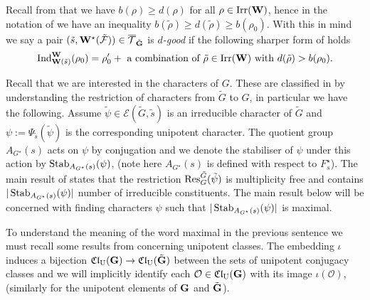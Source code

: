 \documentclass[eqthmnum]{jt-calcs}
\newcommand{\Clu}{\ensuremath{\mathfrak{Cl}_{\mathrm{U}}}}
\renewcommand{\cref}{\Cref}
\begin{document}
\begin{definition}
Recall from \cite[1.1(I)]{spaltenstein:1985:on-the-generalized-springer-correspondence} that we have $b(\rho) \geqslant d(\rho)$ for all $\rho \in \operatorname{Irr}(\mathbf{W})$, hence in the notation of \cref{prop:lusztig-j-ind} we have an inequality $b(\tilde{\rho}) \geqslant d(\tilde{\rho}) \geqslant b(\rho_0)$. With this in mind we say a pair $(\tilde{s},\mathbf{W}^{\star}(\tilde{\mathcal{F}})) \in \overline{\mathcal{T}}_{\tilde{\mathbf{G}}}$ is \emph{$d$-good} if the following sharper form of \cref{prop:lusztig-j-ind} holds
\begin{equation*}
\operatorname{Ind}_{\mathbf{W}(\tilde{s})}^{\mathbf{W}}(\rho_0) = \rho_0' + \text{ a combination of }\tilde{\rho} \in \operatorname{Irr}(\mathbf{W}) \text{ with }d(\tilde{\rho}) > b(\rho_0).
\end{equation*}
\end{definition}

\begin{pa}
Recall that we are interested in the characters of $G$. These are classified in \cite{lusztig:1988:reductive-groups-with-a-disconnected-centre} by understanding the restriction of characters from $\tilde{G}$ to $G$, in particular we have the following. Assume $\tilde{\psi} \in \mathcal{E}(\tilde{G},\tilde{s})$ is an irreducible character of $\tilde{G}$ and $\psi := \Psi_{\tilde{s}}(\tilde{\psi})$ is the corresponding unipotent character. The quotient group $A_{G^{\star}}(s)$ acts on $\psi$ by conjugation and we denote the stabiliser of $\psi$ under this action by $\operatorname{Stab}_{A_{G^{\star}}(s)}(\psi)$, (note here $A_{G^{\star}}(s)$ is defined with respect to $F_s^{\star}$). The main result of \cite{lusztig:1988:reductive-groups-with-a-disconnected-centre} states that the restriction $\operatorname{Res}_G^{\tilde{G}}(\tilde{\psi})$ is multiplicity free and contains $|\operatorname{Stab}_{A_{G^{\star}}(s)}(\psi)|$ number of irreducible constituents. The main result below will be concerned with finding characters $\psi$ such that $|\operatorname{Stab}_{A_{G^{\star}}(s)}(\psi)|$ is maximal.
\end{pa}

\begin{pa}
To understand the meaning of the word maximal in the previous sentence we must recall some results from \cite{taylor:2011:on-unipotent-supports} concerning unipotent classes. The embedding $\iota$ induces a bijection $\Clu(\bG) \to \Clu(\btG)$ between the sets of unipotent conjugacy classes and we will implicitly identify each $\mathcal{O} \in \Clu(\bG)$ with its image $\iota(\mathcal{O})$, (similarly for the unipotent elements of $\mathbf{G}$ and $\tilde{\mathbf{G}}$).
\end{pa}
\end{document}
